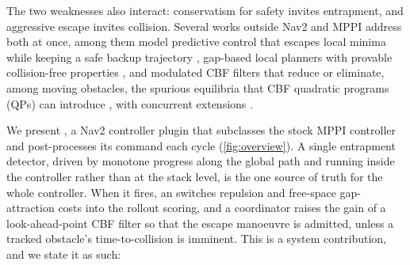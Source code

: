 The two weaknesses also interact: conservatism for safety invites entrapment, and aggressive escape invites collision. Several works outside Nav2 and MPPI address both at once, among them model predictive control that escapes local minima while keeping a safe backup trajectory \citep{soloperto}, gap-based local planners with provable collision-free properties \citep{potential_gap,safer_gap,dynamic_gap}, and modulated CBF filters \citep{mcbf_qp} that reduce or eliminate, among moving obstacles, the spurious equilibria that CBF quadratic programs (QPs) can introduce \citep{reis_cbf_equilibria}, with concurrent extensions \citep{xue_proactive,chen_milp_cbf}.

We present \emph{\sname}, a Nav2 controller plugin that subclasses the stock MPPI controller and post-processes its command each cycle (\cref{fig:overview}). A single entrapment detector, driven by monotone progress along the global path and running inside the controller rather than at the stack level, is the one source of truth for the whole controller. When it fires, an  switches repulsion and free-space gap-attraction costs into the rollout scoring, and a coordinator raises the gain of a look-ahead-point CBF filter so that the escape manoeuvre is admitted, unless a tracked obstacle's time-to-collision is imminent. This is a system contribution, and we state it as such:
